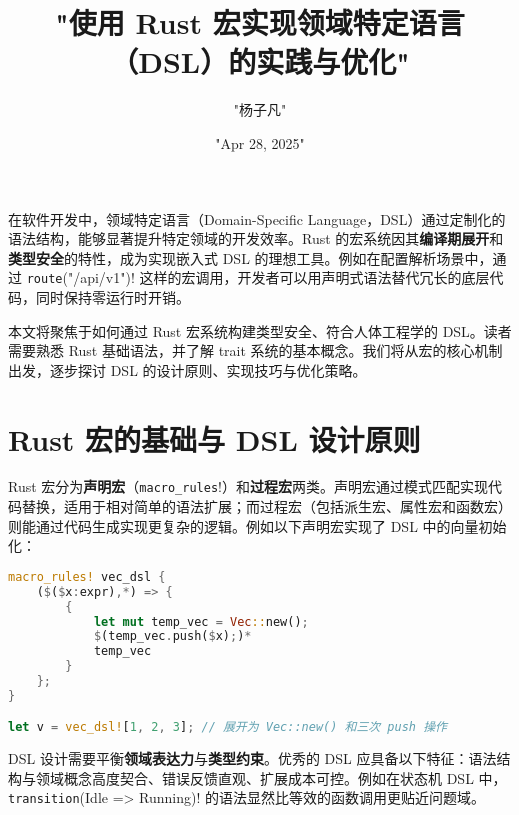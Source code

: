 \title{"使用 Rust 宏实现领域特定语言（DSL）的实践与优化"}
\author{"杨子凡"}
\date{"Apr 28, 2025"}
\maketitle
在软件开发中，领域特定语言（Domain-Specific Language，DSL）通过定制化的语法结构，能够显著提升特定领域的开发效率。Rust 的宏系统因其\textbf{编译期展开}和\textbf{类型安全}的特性，成为实现嵌入式 DSL 的理想工具。例如在配置解析场景中，通过 \verb!route!("/api/v1")! 这样的宏调用，开发者可以用声明式语法替代冗长的底层代码，同时保持零运行时开销。\par
本文将聚焦于如何通过 Rust 宏系统构建类型安全、符合人体工程学的 DSL。读者需要熟悉 Rust 基础语法，并了解 trait 系统的基本概念。我们将从宏的核心机制出发，逐步探讨 DSL 的设计原则、实现技巧与优化策略。\par
\chapter{Rust 宏的基础与 DSL 设计原则}
Rust 宏分为\textbf{声明宏}（\verb!macro_rules!!）和\textbf{过程宏}两类。声明宏通过模式匹配实现代码替换，适用于相对简单的语法扩展；而过程宏（包括派生宏、属性宏和函数宏）则能通过代码生成实现更复杂的逻辑。例如以下声明宏实现了 DSL 中的向量初始化：\par
\begin{lstlisting}[language=rust]
macro_rules! vec_dsl {
    ($($x:expr),*) => {
        {
            let mut temp_vec = Vec::new();
            $(temp_vec.push($x);)*
            temp_vec
        }
    };
}

let v = vec_dsl![1, 2, 3]; // 展开为 Vec::new() 和三次 push 操作
\end{lstlisting}
DSL 设计需要平衡\textbf{领域表达力}与\textbf{类型约束}。优秀的 DSL 应具备以下特征：语法结构与领域概念高度契合、错误反馈直观、扩展成本可控。例如在状态机 DSL 中，\verb!transition!(Idle => Running)! 的语法显然比等效的函数调用更贴近问题域。\par
